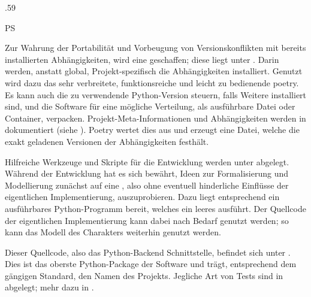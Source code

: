 \begin{minipageContinuingFootnotes}[t]{.59\textwidth}
    \vspace{-1em}
    \begin{enumerateWithCode}{PS}
        \setcounter{enumi}{4}

        \item Zur Wahrung der Portabilität und Vorbeugung von Versionskonflikten mit bereits installierten Abhängigkeiten, wird eine  geschaffen; diese liegt unter .
        Darin werden, anstatt global, Projekt-spezifisch die Abhängigkeiten installiert.
        Genutzt wird dazu das sehr verbreitete, funktionsreiche und leicht zu bedienende poetry.
        Es kann \uA auch die zu verwendende Python-Version steuern, falls Weitere installiert sind, und die Software für eine mögliche Verteilung, \zB als ausführbare Datei oder Container, verpacken.
        Projekt-Meta-Informationen und Abhängigkeiten werden in  dokumentiert (siehe ).
        Poetry wertet dies aus und erzeugt eine  Datei, welche die exakt geladenen Versionen der Abhängigkeiten festhält.

        \item Hilfreiche Werkzeuge und Skripte für die Entwicklung werden unter  abgelegt.
        Während der Entwicklung hat es sich \zB bewährt, Ideen zur Formalisierung und Modellierung zunächst auf eine , also ohne eventuell hinderliche Einflüsse der eigentlichen Implementierung, auszuprobieren.
        Dazu liegt entsprechend ein ausführbares Python-Programm bereit, welches ein leeres  ausführt.
        Der Quellcode der eigentlichen Implementierung kann dabei nach Bedarf genutzt werden; so kann \zB das Modell des Charakters weiterhin genutzt werden.

        \item Dieser Quellcode, also das Python-Backend \inkl Schnittstelle, befindet sich unter .
        Dies ist das oberste Python-Package der Software und trägt, entsprechend dem gängigen Standard, den Namen des Projekts.
        Jegliche Art von Tests sind in  abgelegt; mehr dazu in .

    \end{enumerateWithCode}
\end{minipageContinuingFootnotes}
